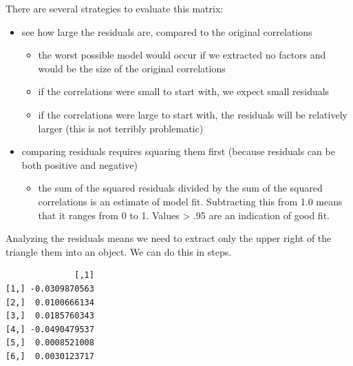 \documentclass[
  english,
]{book}
\newenvironment{Shaded}{\begin{snugshade}}{\end{snugshade}}
\newcommand{\CommentTok}[1]{\textcolor[rgb]{0.56,0.35,0.01}{\textit{#1}}}
\newcommand{\KeywordTok}[1]{\textcolor[rgb]{0.13,0.29,0.53}{\textbf{#1}}}
\newcommand{\NormalTok}[1]{#1}
\newcommand{\OperatorTok}[1]{\textcolor[rgb]{0.81,0.36,0.00}{\textbf{#1}}}
\newcommand{\StringTok}[1]{\textcolor[rgb]{0.31,0.60,0.02}{#1}}
\providecommand{\tightlist}{%
  \setlength{\itemsep}{0pt}\setlength{\parskip}{0pt}}
\begin{document}
There are several strategies to evaluate this matrix:

\begin{itemize}
\tightlist
\item
  see how large the residuals are, compared to the original correlations

  \begin{itemize}
  \tightlist
  \item
    the worst possible model would occur if we extracted no factors and would be the size of the original correlations
  \item
    if the correlations were small to start with, we expect small residuals
  \item
    if the correlations were large to start with, the residuals will be relatively larger (this is not terribly problematic)
  \end{itemize}
\item
  comparing residuals requires squaring them first (because residuals can be both positive and negative)

  \begin{itemize}
  \tightlist
  \item
    the sum of the squared residuals divided by the sum of the squared correlations is an estimate of model fit. Subtracting this from 1.0 means that it ranges from 0 to 1. Values \textgreater{} .95 are an indication of good fit.
  \end{itemize}
\end{itemize}

Analyzing the residuals means we need to extract only the upper right of the triangle them into an object. We can do this in steps.

\begin{Shaded}
\end{Shaded}

\begin{verbatim}
              [,1]
[1,] -0.0309870563
[2,]  0.0100666134
[3,]  0.0185760343
[4,] -0.0490479537
[5,]  0.0008521008
[6,]  0.0030123717
\end{verbatim}
\end{document}
